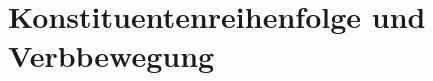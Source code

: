 \documentclass[handout,aspectratio=1610,dvipsnames]{beamer}
\begin{document}
  \section{Konstituentenreihenfolge und Verbbewegung}
  \let\woopsi\section\let\section\subsection\let\subsection\subsubsection
  
  \let\subsection\section\let\section\woopsi
\end{document}
